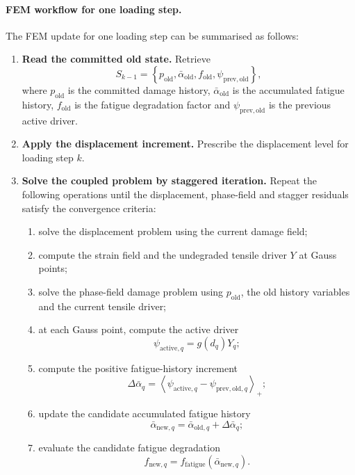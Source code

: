 \paragraph{FEM workflow for one loading step.}
The FEM update for one loading step can be summarised as follows:
\begin{enumerate}
    \item \textbf{Read the committed old state.} Retrieve
    \[
    S_{k-1}
    =
    \left\{
    p_{\mathrm{old}},
    \bar{\alpha}_{\mathrm{old}},
    f_{\mathrm{old}},
    \psi_{\mathrm{prev,old}}
    \right\},
    \]
    where \(p_{\mathrm{old}}\) is the committed damage history, \(\bar{\alpha}_{\mathrm{old}}\) is the accumulated fatigue history, \(f_{\mathrm{old}}\) is the fatigue degradation factor and \(\psi_{\mathrm{prev,old}}\) is the previous active driver.

    \item \textbf{Apply the displacement increment.} Prescribe the displacement level for loading step \(k\).

    \item \textbf{Solve the coupled problem by staggered iteration.} Repeat the following operations until the displacement, phase-field and stagger residuals satisfy the convergence criteria:
    \begin{enumerate}
        \item solve the displacement problem using the current damage field;
        \item compute the strain field and the undegraded tensile driver \(Y\) at Gauss points;
        \item solve the phase-field damage problem using \(p_{\mathrm{old}}\), the old history variables and the current tensile driver;
        \item at each Gauss point, compute the active driver
        \[
        \psi_{\mathrm{active},q}=g(d_q)Y_q;
        \]
        \item compute the positive fatigue-history increment
        \[
        \Delta\bar{\alpha}_q
        =
        \left\langle
        \psi_{\mathrm{active},q}
        -
        \psi_{\mathrm{prev,old},q}
        \right\rangle_{+};
        \]
        \item update the candidate accumulated fatigue history
        \[
        \bar{\alpha}_{\mathrm{new},q}
        =
        \bar{\alpha}_{\mathrm{old},q}
        +
        \Delta\bar{\alpha}_q;
        \]
        \item evaluate the candidate fatigue degradation
        \[
        f_{\mathrm{new},q}
        =
        f_{\mathrm{fatigue}}
        \left(
        \bar{\alpha}_{\mathrm{new},q}
        \right).
        \]
    \end{enumerate}


\end{enumerate}
